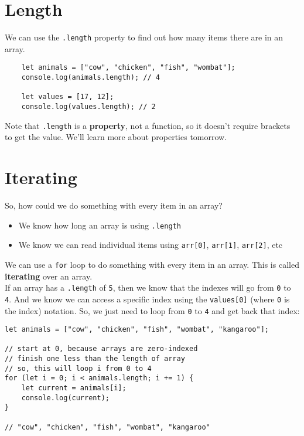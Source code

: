 \pagebreak


\section{Length}

We can use the \texttt{.length} property to find out how many items there are in an array.

\begin{verbatim}
    let animals = ["cow", "chicken", "fish", "wombat"];
    console.log(animals.length); // 4

    let values = [17, 12];
    console.log(values.length); // 2
\end{verbatim}

Note that \texttt{.length} is a \textbf{property}, not a function, so it doesn't require brackets to get the value. We'll learn more about properties tomorrow.



\section{Iterating}

So, how could we do something with every item in an array?

\begin{itemize}
    \item We know how long an array is using \texttt{.length}
    \item We know we can read individual items using \texttt{arr[0]}, \texttt{arr[1]}, \texttt{arr[2]}, etc
\end{itemize}

We can use a \texttt{for} loop to do something with every item in an array. This is called \textbf{iterating} over an array.
\\

If an array has a \texttt{.length} of \texttt{5}, then we know that the indexes will go from \texttt{0} to \texttt{4}. And we know we can access a specific index using the \texttt{values[0]} (where \texttt{0} is the index) notation. So, we just need to loop from \texttt{0} to \texttt{4} and get back that index:


\begin{verbatim}
let animals = ["cow", "chicken", "fish", "wombat", "kangaroo"];

// start at 0, because arrays are zero-indexed
// finish one less than the length of array
// so, this will loop i from 0 to 4
for (let i = 0; i < animals.length; i += 1) {
    let current = animals[i];
    console.log(current);
}

// "cow", "chicken", "fish", "wombat", "kangaroo"
\end{verbatim}

